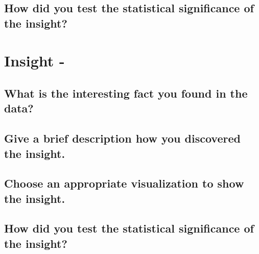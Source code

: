 \documentclass[11pt]{article}
\begin{document}
\subsection{How did you test the statistical significance of the insight?}

\section{Insight - }

\subsection{What is the interesting fact you found in the data?}

\subsection{Give a brief description how you discovered the
insight.}

\subsection{Choose an appropriate visualization to show the insight.}

\subsection{How did you test the statistical significance of the insight?}
\end{document}
